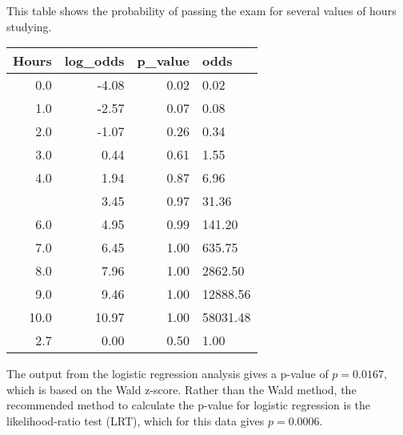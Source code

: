 \documentclass[11pt,dvipsnames,ignorenonframetext,aspectratio=169]{beamer}
\begin{document}
\begin{frame}{}
\protect\hypertarget{section-10}{}

This table shows the probability of passing the exam for several values
of hours studying.

\begin{table}[H]
\centering\begingroup\fontsize{6}{8}\selectfont

\begin{tabular}{rrrl}
\toprule
Hours & log\_odds & p\_value & odds\\
\midrule
\rowcolor{gray!6}  0.0 & -4.08 & 0.02 & 0.02\\
1.0 & -2.57 & 0.07 & 0.08\\
\rowcolor{gray!6}  2.0 & -1.07 & 0.26 & 0.34\\
3.0 & 0.44 & 0.61 & 1.55\\
\rowcolor{gray!6}  4.0 & 1.94 & 0.87 & 6.96\\
\addlinespace
5.0 & 3.45 & 0.97 & 31.36\\
\rowcolor{gray!6}  6.0 & 4.95 & 0.99 & 141.20\\
7.0 & 6.45 & 1.00 & 635.75\\
\rowcolor{gray!6}  8.0 & 7.96 & 1.00 & 2862.50\\
9.0 & 9.46 & 1.00 & 12888.56\\
\addlinespace
\rowcolor{gray!6}  10.0 & 10.97 & 1.00 & 58031.48\\
2.7 & 0.00 & 0.50 & 1.00\\
\bottomrule
\end{tabular}
\endgroup{}
\end{table}

\end{frame}

\begin{frame}{}
\protect\hypertarget{section-11}{}

The output from the logistic regression analysis gives a p-value of
\({\displaystyle p=0.0167}\), which is based on the Wald z-score. Rather
than the Wald method, the recommended method to calculate the p-value
for logistic regression is the likelihood-ratio test (LRT), which for
this data gives \({\displaystyle p=0.0006}\).

\end{frame}
\end{document}
